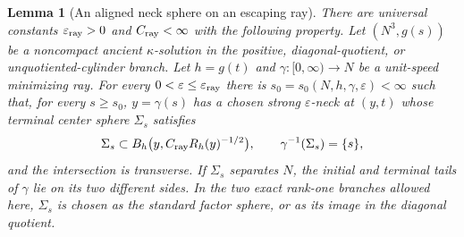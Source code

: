 \documentclass[10pt]{coll-l}
\newtheorem{lemma}[theorem]{Lemma}
\theoremstyle{definition}
\theoremstyle{remark}
\numberwithin{section}{chapter}
\numberwithin{equation}{chapter}
\begin{document}
\begin{lemma}[An aligned neck sphere on an escaping ray]
\label{lem:ncs-aligned-ray-cross-section}
There are universal constants $\varepsilon_{\rm ray}>0$ and
$C_{\rm ray}<\infty$ with the following property.  Let
$(N^3,g(s))$ be a noncompact ancient $\kappa$-solution in the positive,
diagonal-quotient, or unquotiented-cylinder branch.  Let
$h=g(t)$ and
$\gamma:[0,\infty)\to N$ be a unit-speed minimizing ray.  For every
$0<\varepsilon\leq\varepsilon_{\rm ray}$ there is
$s_0=s_0(N,h,\gamma,\varepsilon)<\infty$ such that, for every $s\geq s_0$,
$y=\gamma(s)$ has a chosen strong $\varepsilon$-neck at $(y,t)$ whose
terminal center sphere $\Sigma_s$ satisfies
\begin{equation}
 \Sigma_s\subset B_h\bigl(y,C_{\rm ray}R_h(y)^{-1/2}\bigr),
 \qquad \gamma^{-1}(\Sigma_s)=\{s\},                 \label{eq:ncs-aligned-ray-sphere}
\end{equation}
and the intersection is transverse.  If $\Sigma_s$ separates $N$, the
initial and terminal tails of $\gamma$ lie on its two different sides.
In the two exact rank-one branches allowed here, $\Sigma_s$ is chosen as
the standard factor sphere, or as its image in the diagonal quotient.
\end{lemma}
\end{document}
